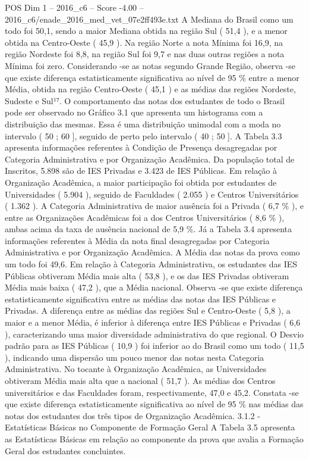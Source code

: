 \begin{textsample}{POS Dim 1 – 2016\_c6 – Score -4.00 – 2016\_c6/enade\_2016\_med\_vet\_07e2ff493e.txt}
A Mediana do Brasil como um todo foi 50,1, sendo a maior Mediana obtida na região Sul ( 51,4 ), e a menor obtida na Centro-Oeste ( 45,9 ).
Na região Norte a nota Mínima foi 16,9, na região Nordeste foi 8,8, na região Sul foi 9,7 e nas duas outras regiões a nota Mínima foi zero.
Considerando -se as notas segundo Grande Região, observa -se que existe diferença estatisticamente significativa ao nível de 95 \% entre a menor Média, obtida na região Centro-Oeste ( 45,1 ) e as médias das regiões Nordeste, Sudeste e Sul¹⁷.
O comportamento das notas dos estudantes de todo o Brasil pode ser observado no Gráfico 3.1 que apresenta um histograma com a distribuição das mesmas.
Essa é uma distribuição unimodal com a moda no intervalo ( 50 ; 60 ], seguido de perto pelo intervalo ( 40 ; 50 ].
A Tabela 3.3 apresenta informações referentes à Condição de Presença desagregadas por Categoria Administrativa e por Organização Acadêmica.
Da população total de Inscritos, 5.898 são de IES Privadas e 3.423 de IES Públicas.
Em relação à Organização Acadêmica, a maior participação foi obtida por estudantes de Universidades ( 5.904 ), seguido de Faculdades ( 2.055 ) e Centros Universitários ( 1.362 ).
A Categoria Administrativa de maior ausência foi a Privada ( 6,7 \% ), e entre as Organizações Acadêmicas foi a dos Centros Universitários ( 8,6 \% ), ambas acima da taxa de ausência nacional de 5,9 \%.
Já a Tabela 3.4 apresenta informações referentes à Média da nota final desagregadas por Categoria Administrativa e por Organização Acadêmica.
A Média das notas da prova como um todo foi 49,6.
Em relação à Categoria Administrativa, os estudantes das IES Públicas obtiveram Média mais alta ( 53,8 ), e os das IES Privadas obtiveram Média mais baixa ( 47,2 ), que a Média nacional.
Observa -se que existe diferença estatisticamente significativa entre as médias das notas das IES Públicas e Privadas.
A diferença entre as médias das regiões Sul e Centro-Oeste ( 5,8 ), a maior e a menor Média, é inferior à diferença entre IES Públicas e Privadas ( 6,6 ), caracterizando uma maior diversidade administrativa do que regional.
O Desvio padrão para as IES Públicas ( 10,9 ) foi inferior ao do Brasil como um todo ( 11,5 ), indicando uma dispersão um pouco menor das notas nesta Categoria Administrativa.
No tocante à Organização Acadêmica, as Universidades obtiveram Média mais alta que a nacional ( 51,7 ).
As médias dos Centros universitários e das Faculdades foram, respectivamente, 47,0 e 45,2.
Constata -se que existe diferença estatisticamente significativa ao nível de 95 \% nas médias das notas dos estudantes dos três tipos de Organização Acadêmica. 3.1.2 - Estatísticas Básicas no Componente de Formação Geral A Tabela 3.5 apresenta as Estatísticas Básicas em relação ao componente da prova que avalia a Formação Geral dos estudantes concluintes.

\end{textsample}
